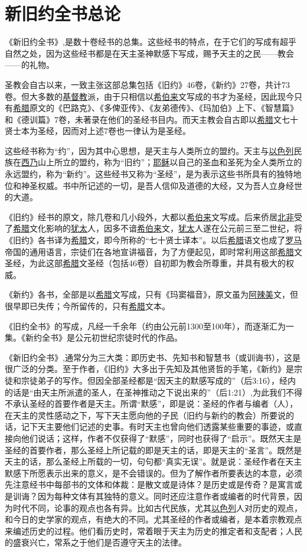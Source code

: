 \chapter*{新旧约全书总论}


《新旧约全书》,是数十卷经书的总集。这些经书的特点，在于它们的写成有超乎自然之处，因为这些经书都是在天主圣神默感下写成，赐予天主的之民——教会——的礼物。

圣教会自古以来，一致主张这部总集包括《旧约》46卷，《新约》27卷，共计73卷。但大多数的\uline{基督教}派，由于只相信以\uline{希伯来}文写成的书才为圣经，因此现今只有\uline{希腊}原文的《巴路克》、《多俾亚传》、《友弟德传》、《玛加伯》上下、《智慧篇》和《德训篇》7卷，未著录在他们的圣经书目内。而天主教会自古即以\uline{希腊}文七十贤士本为圣经，因而对上述7卷也一律认为是圣经。

这些经书称为“约”，因为其中心思想，是天主与人类所立的盟约。天主与\uline{以色列}民族在\uline{西乃}山上所立的盟约，称为“旧约”；\uline{耶稣}以自己的圣血和圣死为全人类所立的永远盟约，称为“新约”。这些经书又称为“圣经”，是为表示这些书所具有的独特地位和神圣权威。书中所记述的一切，是吾人信仰及道德的大经，又为吾人立身经世的大道。

《旧约》经书的原文，除几卷和几小段外，大都以\uline{希伯来}文写成。后来侨居\uline{北非}受了\uline{希腊}文化影响的\uline{犹太}人，因多不谙\uline{希伯来}文，\uline{犹太}人遂在公元前三至二世纪，将《旧约》各书译为\uline{希腊}文，即今所称的“七十贤士译本”。以后\uline{希腊}语文也成了\uline{罗马}帝国的通用语言，宗徒们在各地宣讲福音，为了方便起见，即时常利用这部\uline{希腊}文圣经，为此这部\uline{希腊}文圣经（包括46卷）自初即为教会所尊重，并具有极大的权威。

《新约》各书，全部是以\uline{希腊}文写成，只有《玛窦福音》，原文虽为\uline{阿辣美}文，但很早即已失传；今所留传的，只有\uline{希腊}文本。

《旧约全书》的写成，凡经一千余年（约由公元前1300至100年），而逐渐汇为一集。《新约全书》是公元初世纪宗徒时代的作品。

《新旧约全书》,通常分为三大类：即历史书、先知书和智慧书（或训诲书），这是很广泛的分类。至于作者，《旧约》大多出于先知及其他贤哲的手笔，《新约》是宗徒和宗徒弟子的写作。但因全部圣经都是“因天主的默感写成的”（后3:16），经内的话是“由天主所派遣的圣人，在圣神推动之下说出来的”（后1:21）,为此我们不得不承认圣经的首要作者是天主。所谓“默感”，即是说：圣经的作者与编者（人），在天主的灵性感动之下，写下天主愿向他的子民（旧约与新约的教会）所要说的话，记下天主要他们记述的史事。有时天主也曾向他们透露某些重要的事迹，或直接向他们说话；这样，作者不仅获得了“默感”，同时也获得了“启示”。既然天主是圣经的首要作者，那么圣经上所记载的即是天主的话，即是天主的“圣言”。既然是天主的话，那么圣经上所载的一切，句句都“真实无误”。就是说：圣经作者在天主默感下所愿表示出来的意义，是不会错误的。但为了解作者所要表达的本意，必须先注意经书中每部书的文体和体裁：是散文或是诗体？是历史或是传奇？是寓言或是训诲？因为每种文体有其独特的意义。同时还应注意作者或编者的时代背景，因为时代不同，论事的观点也各有异。比如古代民族，尤其\uline{以色列}人对历史的观点，和今日的史学家的观点，有绝大的不同。尤其圣经的作者或编者，是本着宗教观点来编述历史的过程。他们看历史时，常着眼于天主为历史的推定者和支配者；人民的盛衰兴亡，常系之于他们是否遵守天主的法律。

